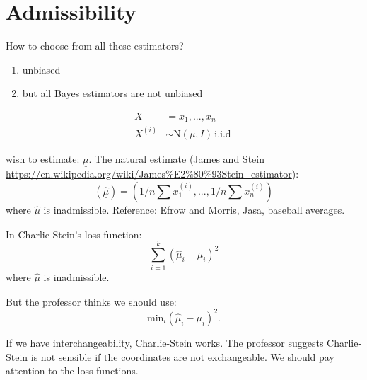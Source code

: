 \documentclass[12pt,letterpaper]{article}
\newcommand{\q}{\underline}
\newcommand{\normal}{\textrm{N}}
\newcommand{\iid}{\textrm{i.i.d}}
\begin{document}
\section*{Admissibility}
How to choose from all these estimators?

\begin{enumerate}
    \item unbiased
    \item but all Bayes estimators are not unbiased    
\end{enumerate}

\begin{equation*}
    \begin{split}
        X &= x_1, ..., x_n\\
        X^{(i)} &\sim \normal(\mu, I) \, \iid\
    \end{split}
\end{equation*}

wish to estimate: $\q \mu$. 
The natural estimate (James and Stein \url{https://en.wikipedia.org/wiki/James%E2%80%93Stein_estimator}):
\begin{equation}
    (\hat {\q \mu}) = (1/n \sum x_1^{(i)}, ..., 1/n \sum x_n^{(i)} )
\end{equation}
where $\hat {\q \mu}$ is inadmissible.
Reference: Efrow and Morris, Jasa, baseball averages.

In Charlie Stein's loss function:
\begin{equation*}
    \sum_{i=1}^{k} (\hat \mu_i - \mu_i)^2
\end{equation*}
where $\hat{\q \mu}$ is inadmissible.

But the professor thinks we should use:
\begin{equation*}
    \textrm{min}_i (\hat \mu_i - \mu_i)^2.
\end{equation*}

If we have interchangeability, Charlie-Stein works.
The professor suggests Charlie-Stein is not sensible if the coordinates are not exchangeable.
We should pay attention to the loss functions.
\end{document}
